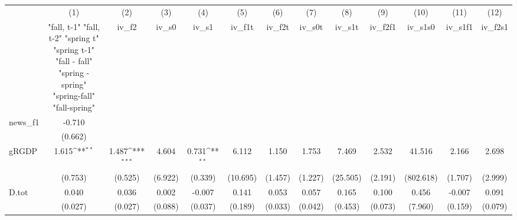 {
\def\sym#1{\ifmmode^{#1}\else\(^{#1}\)\fi}
\begin{tabular}{l*{12}{c}}
\toprule
            &\multicolumn{1}{c}{(1)}&\multicolumn{1}{c}{(2)}&\multicolumn{1}{c}{(3)}&\multicolumn{1}{c}{(4)}&\multicolumn{1}{c}{(5)}&\multicolumn{1}{c}{(6)}&\multicolumn{1}{c}{(7)}&\multicolumn{1}{c}{(8)}&\multicolumn{1}{c}{(9)}&\multicolumn{1}{c}{(10)}&\multicolumn{1}{c}{(11)}&\multicolumn{1}{c}{(12)}\\
            &\multicolumn{1}{c}{  "fall, t-1" "fall, t-2" "spring t" "spring t-1"  "fall - fall" "spring - spring" "spring-fall" "fall-spring" }&\multicolumn{1}{c}{iv\_f2}&\multicolumn{1}{c}{iv\_s0}&\multicolumn{1}{c}{iv\_s1}&\multicolumn{1}{c}{iv\_f1t}&\multicolumn{1}{c}{iv\_f2t}&\multicolumn{1}{c}{iv\_s0t}&\multicolumn{1}{c}{iv\_s1t}&\multicolumn{1}{c}{iv\_f2f1}&\multicolumn{1}{c}{iv\_s1s0}&\multicolumn{1}{c}{iv\_s1f1}&\multicolumn{1}{c}{iv\_f2s1}\\
\midrule
news\_f1     &      -0.710         &                     &                     &                     &                     &                     &                     &                     &                     &                     &                     &                     \\
            &     (0.662)         &                     &                     &                     &                     &                     &                     &                     &                     &                     &                     &                     \\
\addlinespace
gRGDP       &       1.615\sym{**} &       1.487\sym{***}&       4.604         &       0.731\sym{**} &       6.112         &       1.150         &       1.753         &       7.469         &       2.532         &      41.516         &       2.166         &       2.698         \\
            &     (0.753)         &     (0.525)         &     (6.922)         &     (0.339)         &    (10.695)         &     (1.457)         &     (1.227)         &    (25.505)         &     (2.191)         &   (802.618)         &     (1.707)         &     (2.999)         \\
\addlinespace
D.tot       &       0.040         &       0.036         &       0.002         &      -0.007         &       0.141         &       0.053         &       0.057         &       0.165         &       0.100         &       0.456         &      -0.007         &       0.091         \\
            &     (0.027)         &     (0.027)         &     (0.088)         &     (0.037)         &     (0.189)         &     (0.033)         &     (0.042)         &     (0.453)         &     (0.073)         &     (7.960)         &     (0.159)         &     (0.079)         \\

\end{tabular}}
